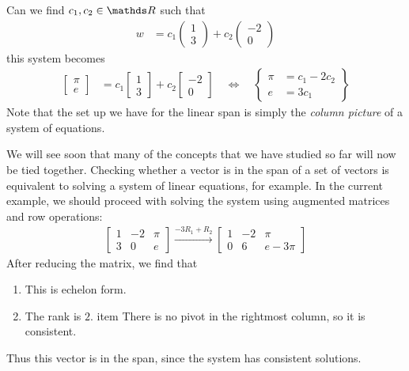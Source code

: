 \documentclass[11pt]{article}
\begin{document}
Can we find $c_1, c_2 \in \bbR$ such that
\begin{align*}
w &= c_1 \begin{pmatrix}1\\3\end{pmatrix} + c_2 \begin{pmatrix}-2\\0\end{pmatrix}
\end{align*}
this system becomes
\begin{align*}
\begin{bmatrix}\pi \\ e\end{bmatrix} &=
c_1 \begin{bmatrix}1\\3\end{bmatrix} +
c_2 \begin{bmatrix}-2\\0\end{bmatrix}
\quad\Longleftrightarrow\quad
\left\{
\begin{aligned}
\pi &= c_1 - 2 c_2
\\
e &= 3 c_1
\end{aligned}
\right\}
\end{align*}
Note that the set up we have for the linear span is simply the \emph{column picture} of a system of equations.

We will see soon that many of the concepts that we have studied so far will now be tied together. Checking whether a vector is in the span of a set of vectors is equivalent to solving a system of linear equations, for example. In the current example, we should proceed with solving the system using augmented matrices and row operations:
\begin{align*}
\left[
\begin{matrix}
1 & -2 & \pi
\\
3 & 0 & e
\end{matrix}
\right]
\xrightarrow[]{-3R_1 + R_2}
\left[
\begin{matrix}
1 & -2 & \pi
\\
0 & 6 & e-3\pi
\end{matrix}
\right]
\end{align*}
After reducing the matrix, we find that
\begin{enumerate}
\item{
This is echelon form.
}
\item{
The rank is $2$.
}
item{
There is no pivot in the rightmost column, so it is consistent.
}
\end{enumerate}
Thus this vector is in the span, since the system has consistent solutions.
\end{document}
